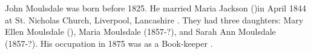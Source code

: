 
John Moulsdale was born before 1825.  He married Maria Jackson ()in April 1844 at St. Nicholas Church, Liverpool, Lancashire \cite{JohnMoulsdaleMarriage}.  They had three daughters:  Mary Ellen Moulsdale (), Maria Moulsdale (1857-?), and Sarah Ann Moulsdale (1857-?).
 His occupation in 1875 was as a Book-keeper \cite{JohnMoulsdaleOccupation}.
